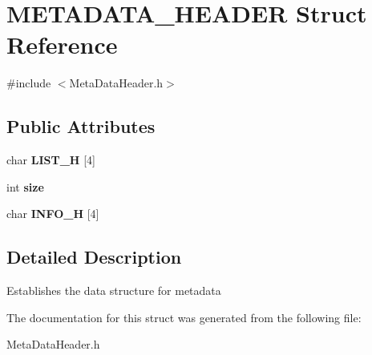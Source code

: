 \hypertarget{structMETADATA__HEADER}{}\section{M\+E\+T\+A\+D\+A\+T\+A\+\_\+\+H\+E\+A\+D\+ER Struct Reference}
\label{structMETADATA__HEADER}


{\ttfamily \#include $<$Meta\+Data\+Header.\+h$>$}

\subsection*{Public Attributes}
\begin{DoxyCompactItemize}
\item 
\mbox{\label{structMETADATA__HEADER_ab4cc088438946467021b547b0cf650d7}} 
char {\bfseries L\+I\+S\+T\+\_\+H} \mbox{[}4\mbox{]}
\item 
\mbox{\label{structMETADATA__HEADER_ab3c74675635c3451fd1204e635b514ef}} 
int {\bfseries size}
\item 
\mbox{\label{structMETADATA__HEADER_ac5c1bc89f56406daa7f4fd1e1eac8e25}} 
char {\bfseries I\+N\+F\+O\+\_\+H} \mbox{[}4\mbox{]}
\end{DoxyCompactItemize}


\subsection{Detailed Description}
Establishes the data structure for metadata 

The documentation for this struct was generated from the following file\+:\begin{DoxyCompactItemize}
\item 
Meta\+Data\+Header.\+h\end{DoxyCompactItemize}
